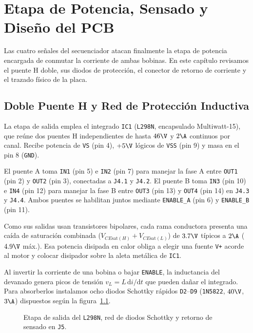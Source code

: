 \chapter{Etapa de Potencia, Sensado y Diseño del PCB}
\label{sec:potencia_pcb}

Las cuatro señales del secuenciador atacan finalmente la etapa de potencia encargada de conmutar la corriente de
ambas bobinas. En este capítulo revisamos el puente H doble, sus diodos de protección, el conector de retorno de
corriente y el trazado físico de la placa.

\section{Doble Puente H y Red de Protección Inductiva}
\label{sec:puente_h_diodos}

La etapa de salida emplea el integrado \texttt{IC1} (\texttt{L298N}, encapsulado Multiwatt-15), que reúne dos
puentes H independientes de hasta $46\V$ y $2\A$ continuos por canal. Recibe potencia de \texttt{VS} (pin 4),
$+5\V$ lógicos de \texttt{VSS} (pin 9) y masa en el pin 8 (\texttt{GND}).

El puente A toma \texttt{IN1} (pin 5) e \texttt{IN2} (pin 7) para manejar la fase A entre \texttt{OUT1} (pin 2) y
\texttt{OUT2} (pin 3), conectadas a \texttt{J4.1} y \texttt{J4.2}. El puente B toma \texttt{IN3} (pin 10) e
\texttt{IN4} (pin 12) para manejar la fase B entre \texttt{OUT3} (pin 13) y \texttt{OUT4} (pin 14) en
\texttt{J4.3} y \texttt{J4.4}. Ambos puentes se habilitan juntos mediante \texttt{ENABLE\_A} (pin 6) y
\texttt{ENABLE\_B} (pin 11).

Como sus salidas usan transistores bipolares, cada rama conductora presenta una caída de saturación combinada
($V_{CE\text{sat}(H)} + V_{CE\text{sat}(L)}$) de $3.7\V$ típicos a $2\A$ ($4.9\V$ máx.). Esa potencia disipada en
calor obliga a elegir una fuente \texttt{V+} acorde al motor y colocar disipador sobre la aleta metálica de
\texttt{IC1}.

Al invertir la corriente de una bobina o bajar \texttt{ENABLE}, la inductancia del devanado genera picos de
tensión $v_L = L\,\mathrm{d}i/\mathrm{d}t$ que pueden dañar el integrado. Para absorberlos instalamos ocho diodos
Schottky rápidos \texttt{D2}--\texttt{D9} (\texttt{1N5822}, $40\V$, $3\A$) dispuestos según la
figura~\ref{crkt.ej4:puente_diodos}.

\begin{figure}[!ht]
  \centering
  
  \caption{Etapa de salida del \texttt{L298N}, red de diodos Schottky y retorno de sensado en \texttt{J5}.}
  \label{crkt.ej4:puente_diodos}
\end{figure}

